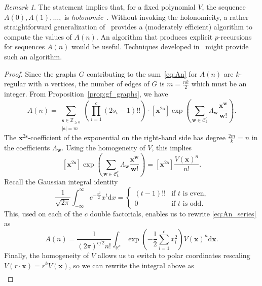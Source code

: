 \documentclass[a4paper,oneside]{amsart}
\newcommand{\bb}[1]{\boldsymbol{#1}}
\numberwithin{theorem}{section}
\theoremstyle{remark}
\newtheorem{remark}[theorem]{Remark}
\newcommand{\R}{\mathbb{R}}
\newcommand{\Z}{\mathbb{Z}}
\renewcommand{\d}{\mathrm{d}}
\begin{document}
\begin{remark}
The statement implies that, for a fixed polynomial $V$, the sequence $A(0), A(1), \ldots,$ is \emph{holonomic}~\cite{MR4621625}. Without invoking the holonomicity, a rather straightforward generalization of~\cite[\S 4]{BMW24:Bicolored} provides a (moderately efficient) algorithm to compute the values of $A(n)$. An algorithm that produces explicit $p$-recursions for sequences $A(n)$ would be useful. Techniques developed in~\cite{ChyMis25:DifferentialEquationsGeneratingFunction,BCL25:MultivariateIntegrationDModules} might provide such an algorithm.
\end{remark}

\begin{proof}
  Since the graphs $G$ contributing to the sum~\eqref{eq:An} for $A(n)$ are $k$-regular with $n$ vertices, the number of edges of $G$ is $m=\tfrac{n k}{2}$ which must be an integer. From Proposition~\ref{prop:gf_graphs}, we have 
  \begin{equation}
    \label{eq:An_series}
    A(n) = \sum_{\substack{\bb{s} \in \Z_{\geq 0} \\ |\bb{s}| = m}} \left(\prod_{i=1}^c (2s_i-1)!! \right)
\cdot [\bb{x}^{2\bb{s}}]\exp\left( \sum_{\bb w \in\mathcal C_k^c
} \Lambda_{\bb{w}} \frac{\bb{x}^{\bb{w}}}{\bb{w}!} \right).
  \end{equation}
  The $\bb{x}^{2\bb{s}}$-coefficient of the exponential on the right-hand side has degree $\tfrac{2m}{k} = n$ in the coefficients $\Lambda_{\bb{w}}$. Using the homogeneity of $V$, this implies
  \[
    [\bb{x}^{2\bb{s}}]\exp\left( \sum_{\bb w \in\mathcal C_k^c} \Lambda_{\bb{w}} \frac{\bb{x}^{\bb{w}}}{\bb{w}!} \right) = [\bb{x}^{2\bb{s}}] \frac{V(\bb{x})^{n}}{n!}.
  \]
  Recall the Gaussian integral identity
  \[
    \frac{1}{\sqrt{2\pi}} \int_{-\infty}^{\infty} e^{-\frac{x^2}{2}} x^t \d x = \left\{ \begin{array}{ll}
      (t-1)!! & \text{if } t \text{ is even,} \\
      0 & \text{if } t \text{ is odd.}
    \end{array} \right.
  \]
  This, used on each of the $c$ double factorials, enables us to rewrite \eqref{eq:An_series} as 
  \[
    A(n) = \frac{1}{(2\pi)^{c/2} n!} \int_{\R^c} \exp\left( -\frac{1}{2} \sum_{i=1}^{c} x_i^2 \right) V(\bb{x})^{n} \d\bb{x}.
  \]
  Finally, the homogeneity of $V$ allows us to switch to polar coordinates rescaling $V(r\cdot \bb{x}) = r^k V(\bb{x})$, so we can rewrite the integral above as
  \begin{align*}

\end{align*}
\end{proof}
\end{document}
